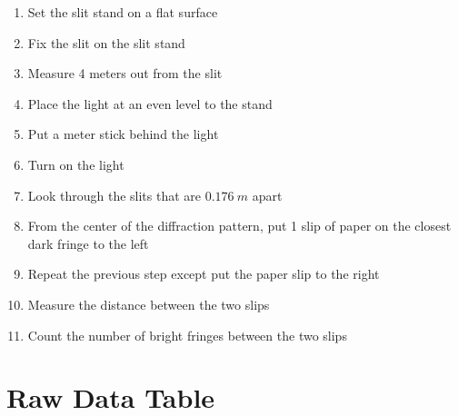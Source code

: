 \documentclass[12pt]{article}
\begin{document}
\begin{enumerate}
	\item Set the slit stand on a flat surface
	\item Fix the slit on the slit stand
	\item Measure 4 meters out from the slit
	\item Place the light at an even level to the stand
	\item Put a meter stick behind the light
	\item Turn on the light
	\item Look through the slits that are $0.176\ m$ apart
	\item From the center of the diffraction pattern, put 1 slip of paper on the closest dark fringe to the left
	\item Repeat the previous step except put the paper slip to the right
	\item Measure the distance between the two slips
	\item Count the number of bright fringes between the two slips
\end{enumerate}

\section{Raw Data Table}

\begin{table}[H]
	\def\arraystretch{1.5}
\end{table}
\end{document}
